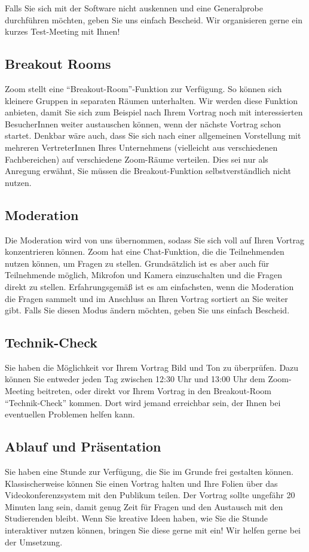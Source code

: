 \documentclass[
  paper=a4,
  fontsize=12pt,
  DIV=16,
  headheight=30pt,
  footheight=45pt,
  headinclude,
  parskip=half,
]{scrartcl}
\begin{document}
Falls Sie sich mit der Software nicht auskennen und eine Generalprobe durchführen möchten, geben Sie uns einfach Bescheid.
Wir organisieren gerne ein kurzes Test-Meeting mit Ihnen!

\subsection*{Breakout Rooms}
Zoom stellt eine \enquote{Breakout-Room}-Funktion zur Verfügung.
So können sich kleinere Gruppen in separaten Räumen unterhalten.
Wir werden diese Funktion anbieten, damit Sie sich zum Beispiel nach Ihrem Vortrag noch mit interessierten BesucherInnen weiter austauschen können, wenn der nächste Vortrag schon startet.
Denkbar wäre auch, dass Sie sich nach einer allgemeinen Vorstellung mit mehreren VertreterInnen Ihres Unternehmens (vielleicht aus verschiedenen Fachbereichen) auf verschiedene Zoom-Räume verteilen.
Dies sei nur als Anregung erwähnt, Sie müssen die Breakout-Funktion selbstverständlich nicht nutzen.

\subsection*{Moderation}
Die Moderation wird von uns übernommen, sodass Sie sich voll auf Ihren Vortrag konzentrieren können.
Zoom hat eine Chat-Funktion, die die Teilnehmenden nutzen können, um Fragen zu stellen.
Grundsätzlich ist es aber auch für Teilnehmende möglich, Mikrofon und Kamera einzuschalten und die Fragen direkt zu stellen.
Erfahrungsgemäß ist es am einfachsten, wenn die Moderation die Fragen sammelt und im Anschluss an Ihren Vortrag sortiert an Sie weiter gibt.
Falls Sie diesen Modus ändern möchten, geben Sie uns einfach Bescheid.


\subsection*{Technik-Check}
Sie haben die Möglichkeit vor Ihrem Vortrag Bild und Ton zu überprüfen.
Dazu können Sie entweder jeden Tag zwischen 12:30 Uhr und 13:00 Uhr dem Zoom-Meeting beitreten, oder direkt vor Ihrem Vortrag in den Breakout-Room \enquote{Technik-Check} kommen.
Dort wird jemand erreichbar sein, der Ihnen bei eventuellen Problemen helfen kann.


\subsection*{Ablauf und Präsentation}
Sie haben eine Stunde zur Verfügung, die Sie im Grunde frei gestalten können.
Klassischerweise können Sie einen Vortrag halten und Ihre Folien über das Videokonferenzsystem mit den Publikum teilen.
Der Vortrag sollte ungefähr 20 Minuten lang sein, damit genug Zeit für Fragen und den Austausch mit den Studierenden bleibt.
Wenn Sie kreative Ideen haben, wie Sie die Stunde interaktiver nutzen können, bringen Sie diese gerne mit ein!
Wir helfen gerne bei der Umsetzung.
\end{document}
